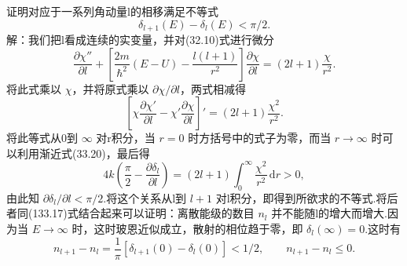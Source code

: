 \begin{xiti}

\quad 证明对应于一系列角动量l的相移满足不等式
\begin{equation*}
  \delta_{l+1}(E)-\delta_l(E)<\pi/2.
\end{equation*}
解：我们把l看成连续的实变量，并对(32.10)式进行微分
\begin{equation*}
  \frac{\partial\chi''}{\partial l}
  +\left[\frac{2m}{\hbar^2}(E-U)
  -\frac{l(l+1)}{r^2}\right]\frac{\partial\chi}{\partial l}
  =(2l+1)\frac{\chi}{r^2}.
\end{equation*}
将此式乘以 $\chi$，并将原式乘以 $\partial\chi/\partial l$，两式相减得
\begin{equation*}
  \left[\chi\frac{\partial\chi'}{\partial l}
  -\chi'\frac{\partial\chi}{\partial l}\right]'
  =(2l+1)\frac{\chi^2}{r^2}.
\end{equation*}
将此等式从0到 $\infty$ 对r积分，当 $r=0$ 时方括号中的式子为零，而当 $r\to\infty$ 时可以利用渐近式(33.20)，最后得
\begin{equation*}
  4k\left(\frac{\pi}{2}-\frac{\partial\delta_l}{\partial l}\right)
  =(2l+1)\int_0^{\infty}\frac{\chi^2}{r^2}\,\mathrm{d}r>0,
\end{equation*}
由此知 $\partial\delta_l/\partial l<\pi/2$.将这个关系从l到 $l+1$ 对l积分，即得到所欲求的不等式.将后者同(133.17)式结合起来可以证明：离散能级的数目 $n_l$ 并不能随l的增大而增大.因为当 $E\to\infty$ 时，这时玻恩近似成立，散射的相位趋于零，即 $\delta_l(\infty)=0$.这时有
\begin{equation*}
  n_{l+1}-n_l=\frac{1}{\pi}
  \left[\delta_{l+1}(0)-\delta_l(0)\right]<1/2,
  \qquad
  n_{l+1}-n_l\leqslant0.
\end{equation*}

\end{xiti}

